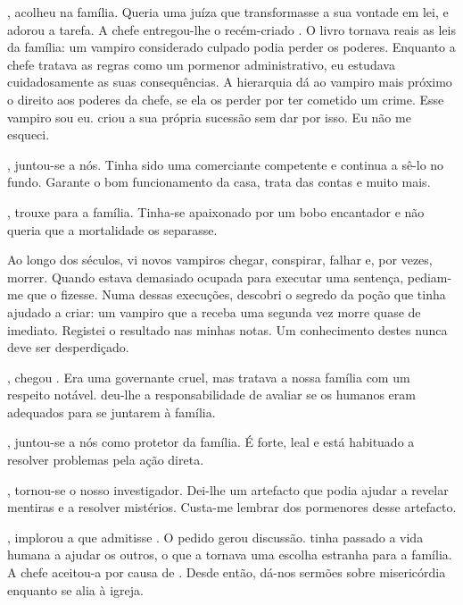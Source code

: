 {,  acolheu  na família. Queria uma juíza que transformasse a sua vontade em lei, e  adorou a tarefa. A chefe entregou-lhe o recém-criado . O livro tornava reais as leis da família: um vampiro considerado culpado podia perder os poderes. Enquanto a chefe tratava as regras como um pormenor administrativo, eu estudava cuidadosamente as suas consequências. A hierarquia dá ao vampiro mais próximo o direito aos poderes da chefe, se ela os perder por ter cometido um crime. Esse vampiro sou eu.  criou a sua própria sucessão sem dar por isso. Eu não me esqueci.

,  juntou-se a nós. Tinha sido uma comerciante competente e continua a sê-lo no fundo. Garante o bom funcionamento da casa, trata das contas e muito mais.

,  trouxe  para a família. Tinha-se apaixonado por um bobo encantador e não queria que a mortalidade os separasse.

Ao longo dos séculos, vi novos vampiros chegar, conspirar, falhar e, por vezes, morrer. Quando  estava demasiado ocupada para executar uma sentença, pediam-me que o fizesse. Numa dessas execuções, descobri o segredo da poção que tinha ajudado a criar: um vampiro que a receba uma segunda vez morre quase de imediato. Registei o resultado nas minhas notas. Um conhecimento destes nunca deve ser desperdiçado.

, chegou . Era uma governante cruel, mas tratava a nossa família com um respeito notável.  deu-lhe a responsabilidade de avaliar se os humanos eram adequados para se juntarem à família.

,  juntou-se a nós como protetor da família. É forte, leal e está habituado a resolver problemas pela ação direta.

,  tornou-se o nosso investigador. Dei-lhe um artefacto que podia ajudar a revelar mentiras e a resolver mistérios. Custa-me lembrar dos pormenores desse artefacto.

,  implorou a  que admitisse . O pedido gerou discussão.  tinha passado a vida humana a ajudar os outros, o que a tornava uma escolha estranha para a família. A chefe aceitou-a por causa de . Desde então,  dá-nos sermões sobre misericórdia enquanto se alia à igreja.

}

